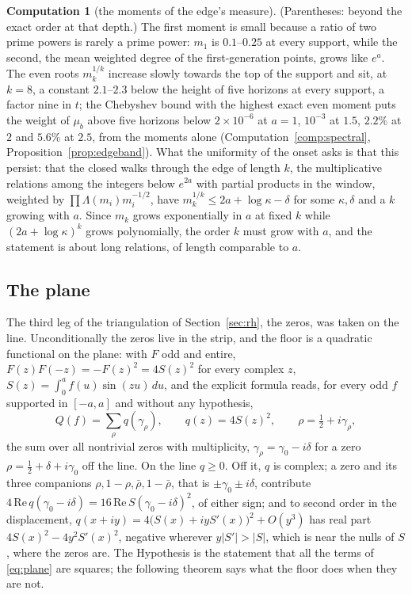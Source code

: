 \documentclass[11pt]{article}
\theoremstyle{definition}
\newtheorem{computation}[theorem]{Computation}
\theoremstyle{remark}
\begin{document}
\begin{computation}[the moments of the edge's measure]
(Parentheses: beyond the exact order at that depth.) The first moment is small because a ratio of two prime powers is rarely a prime power: $m_1$ is $0.1$--$0.25$ at every support, while the second, the mean weighted degree of the first-generation points, grows like $e^{a}$. The even roots $m_k^{1/k}$ increase slowly towards the top of the support and sit, at $k=8$, a constant $2.1$--$2.3$ below the height of five horizons at every support, a factor nine in $t$; the Chebyshev bound with the highest exact even moment puts the weight of $\mu_b$ above five horizons below $2\times10^{-6}$ at $a=1$, $10^{-3}$ at $1.5$, $2.2\%$ at $2$ and $5.6\%$ at $2.5$, from the moments alone (Computation~\ref{comp:spectral}, Proposition~\ref{prop:edgeband}). What the uniformity of the onset asks is that this persist: that the closed walks through the edge of length $k$, the multiplicative relations among the integers below $e^{2a}$ with partial products in the window, weighted by $\prod\Lambda(m_i)m_i^{-1/2}$, have $m_k^{1/k}\le2a+\log\kappa-\delta$ for some $\kappa,\delta$ and a $k$ growing with $a$. Since $m_k$ grows exponentially in $a$ at fixed $k$ while $(2a+\log\kappa)^k$ grows polynomially, the order $k$ must grow with $a$, and the statement is about long relations, of length comparable to $a$.
\end{computation}


\subsection{The plane}\label{sec:plane}

The third leg of the triangulation of Section~\ref{sec:rh}, the zeros, was taken on the line. Unconditionally the zeros live in the strip, and the floor is a quadratic functional on the plane: with $F$ odd and entire, $F(z)F(-z)=-F(z)^2=4S(z)^2$ for every complex $z$, $S(z)=\int_0^af(u)\sin(zu)\,du$, and the explicit formula reads, for every odd $f$ supported in $[-a,a]$ and without any hypothesis,
\begin{equation}\label{eq:plane}
Q(f)=\sum_\rho q(\gamma_\rho),\qquad q(z)=4S(z)^2,\qquad \rho=\tfrac12+i\gamma_\rho ,
\end{equation}
the sum over all nontrivial zeros with multiplicity, $\gamma_\rho=\gamma_0-i\delta$ for a zero $\rho=\tfrac12+\delta+i\gamma_0$ off the line. On the line $q\ge0$. Off it, $q$ is complex; a zero and its three companions $\rho,1-\rho,\bar\rho,1-\bar\rho$, that is $\pm\gamma_0\pm i\delta$, contribute $4\,\mathrm{Re}\,q(\gamma_0-i\delta)=16\,\mathrm{Re}\,S(\gamma_0-i\delta)^2$, of either sign; and to second order in the displacement, $q(x+iy)=4\big(S(x)+iyS'(x)\big)^2+O(y^3)$ has real part $4S(x)^2-4y^2S'(x)^2$, negative wherever $y|S'|>|S|$, which is near the nulls of $S$, where the zeros are. The Hypothesis is the statement that all the terms of \eqref{eq:plane} are squares; the following theorem says what the floor does when they are not.
\end{document}
